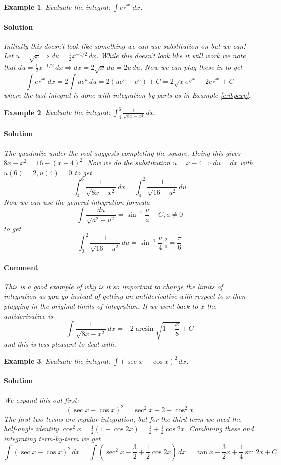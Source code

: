 \documentclass[letterpaper, 11pt, openany]{book}
\theoremstyle{mytheoremstyle}
\theoremstyle{myexamplestyle}
\newtheorem{example}{Example}[section]
\newenvironment{solution}{\paragraph{\sffamily \smaller \fontseries{b}\selectfont Solution}}{\hfill\faSquare}
\newenvironment{commentary}{\paragraph{\sffamily \smaller \fontseries{b}\selectfont Comment}}{}
\begin{document}
\begin{example}\label{e:intsummexpsub}
    Evaluate the integral: $\displaystyle \int e^{\sqrt{x}} \, dx$.
    \begin{solution}
        Initially this doesn't look like something we can use substitution on but we can! Let $u = \sqrt{x} \Rightarrow du = \frac{1}{2}x^{-1/2}\, dx$. While this doesn't look like it will work we note that $du = \frac{1}{2}x^{-1/2}\, dx \Rightarrow dx = 2\sqrt{x}\, du = 2u\, du$. Now we can plug these in to get
        \[\int e^{\sqrt{x}} \, dx = 2\int u e^{u} \, du = 2(u e^{u} - e^{u}) + C = 2\sqrt{x} e^{\sqrt{x}} - 2e^{\sqrt{x}} + C\]
        where the last integral is done with integration by parts as in Example \ref{e:ibpexp}.
    \end{solution}
\end{example}

\begin{example}\label{e:int-sub-then-invsin}
    Evaluate the integral: $\displaystyle \int_{4}^{6} \frac{1}{\sqrt{8x - x^{2}}} \, dx$.
    \begin{solution}
        The quadratic under the root suggests completing the square. Doing this gives $8x - x^{2} = 16 - (x - 4)^{2}$. Now we do the substitution $u = x - 4 \Rightarrow du = dx$ with $u(6) = 2, u(4) = 0$ to get
        \[\int_{4}^{6} \frac{1}{\sqrt{8x - x^{2}}} \, dx = \int_{0}^{2} \frac{1}{\sqrt{16 - u^{2}}} \, du\]
        Now we can use the general integration formula
        \[ \int \frac{du}{\sqrt{a^{2} - u^{2}}} = \sin^{-1} \frac{u}{a} + C, a \neq 0 \]
        to get
        \[\int_{0}^{2} \frac{1}{\sqrt{16 - u^{2}}} \, du  = \sin^{-1} \frac{u}{4}\bigg|_{0}^{2} = \frac{\pi}{6}\]
    \end{solution}
    \begin{commentary}
        This is a good example of why is it so important to change the limits of integration as you go instead of getting an antiderivative with respect to $x$ then plugging in the original limits of integration. If we went back to $x$ the antiderivative is
        \[\int \frac{1}{\sqrt{8x - x^{2}}} \, dx = -2\arcsin \sqrt{1 - \frac{x}{8}} + C\]
        and this is less pleasant to deal with. \faMeh
    \end{commentary}
\end{example}

\begin{example}
    Evaluate the integral: $\displaystyle \int (\sec x - \cos x)^{2} \, dx$.
    \begin{solution}
        We  expand this out first:         
        \[(\sec x - \cos x)^{2} = \sec^{2} x - 2 + \cos^{2} x\]
        The first two terms are regular integration, but for the third term we need the half-angle identity $\cos^{2} x = \frac{1}{2} \left( 1 + \cos 2x \right) = \frac{1}{2} + \frac{1}{2} \cos 2x$. Combining these and integrating term-by-term we get
        \[\int (\sec x - \cos x)^{2} \, dx = \int \left( \sec^{2} x - \frac{3}{2} + \frac{1}{2} \cos 2x \right) \, dx = \tan x - \frac{3}{2}x + \frac{1}{4} \sin 2x + C\]
    \end{solution}
\end{example}
\end{document}
